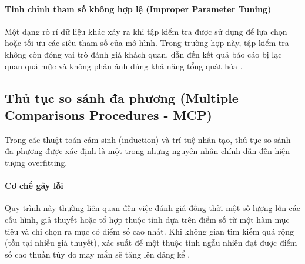 \paragraph{Tinh chỉnh tham số không hợp lệ (Improper Parameter Tuning)}

Một dạng rò rỉ dữ liệu khác xảy ra khi tập kiểm tra được sử dụng để lựa chọn hoặc tối ưu các siêu tham số của mô hình. Trong trường hợp này, tập kiểm tra không còn đóng vai trò đánh giá khách quan, dẫn đến kết quả báo cáo bị lạc quan quá mức và không phản ánh đúng khả năng tổng quát hóa \cite[p.~32]{Bishop2006}.

\subsection{Thủ tục so sánh đa phương (Multiple Comparisons Procedures - MCP)}

Trong các thuật toán cảm sinh (induction) và trí tuệ nhân tạo, thủ tục so sánh đa phương được xác định là một trong những nguyên nhân chính dẫn đến hiện tượng overfitting.

\paragraph{Cơ chế gây lỗi}

Quy trình này thường liên quan đến việc đánh giá đồng thời một số lượng lớn các cấu hình, giả thuyết hoặc tổ hợp thuộc tính dựa trên điểm số từ một hàm mục tiêu và chỉ chọn ra mục có điểm số cao nhất. Khi không gian tìm kiếm quá rộng (tồn tại nhiều giả thuyết), xác suất để một thuộc tính ngẫu nhiên đạt được điểm số cao thuần túy do may mắn sẽ tăng lên đáng kể \cite{Ying2019}.
